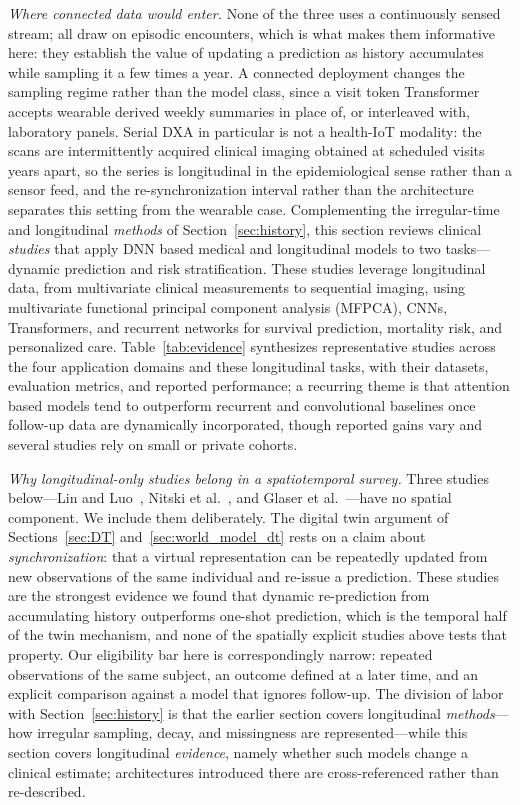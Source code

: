 \documentclass[journal]{IEEEtran}
\begin{document}
\emph{Where connected data would enter.} None of the three uses a continuously sensed stream; all draw on episodic encounters, which is what makes them informative here: they establish the value of updating a prediction as history accumulates while sampling it a few times a year. A connected deployment changes the sampling regime rather than the model class, since a visit token Transformer accepts wearable derived weekly summaries in place of, or interleaved with, laboratory panels. Serial DXA in particular is not a health-IoT modality: the scans are intermittently acquired clinical imaging obtained at scheduled visits years apart, so the series is longitudinal in the epidemiological sense rather than a sensor feed, and the re-synchronization interval rather than the architecture separates this setting from the wearable case.
\else
Complementing the irregular-time and longitudinal \emph{methods} of Section~\ref{sec:history}, this section reviews clinical \emph{studies} that apply DNN based medical and longitudinal models to two tasks---dynamic prediction and risk stratification. These studies leverage longitudinal data, from multivariate clinical measurements to sequential imaging, using multivariate functional principal component analysis (MFPCA), CNNs, Transformers, and recurrent networks for survival prediction, mortality risk, and personalized care. Table~\ref{tab:evidence} synthesizes representative studies across the four application domains and these longitudinal tasks, with their datasets, evaluation metrics, and reported performance; a recurring theme is that attention based models tend to outperform recurrent and convolutional baselines once follow-up data are dynamically incorporated, though reported gains vary and several studies rely on small or private cohorts.

\emph{Why longitudinal-only studies belong in a spatiotemporal survey.} Three studies below---Lin and Luo~\cite{lin2022deep}, Nitski et al.~\cite{nitski2021long}, and Glaser et al.~\cite{glaser2022deep}---have no spatial component. We include them deliberately. The digital twin argument of Sections~\ref{sec:DT} and~\ref{sec:world_model_dt} rests on a claim about \emph{synchronization}: that a virtual representation can be repeatedly updated from new observations of the same individual and re-issue a prediction. These studies are the strongest evidence we found that dynamic re-prediction from accumulating history outperforms one-shot prediction, which is the temporal half of the twin mechanism, and none of the spatially explicit studies above tests that property. Our eligibility bar here is correspondingly narrow: repeated observations of the same subject, an outcome defined at a later time, and an explicit comparison against a model that ignores follow-up. The division of labor with Section~\ref{sec:history} is that the earlier section covers longitudinal \emph{methods}---how irregular sampling, decay, and missingness are represented---while this section covers longitudinal \emph{evidence}, namely whether such models change a clinical estimate; architectures introduced there are cross-referenced rather than re-described.
\end{document}
